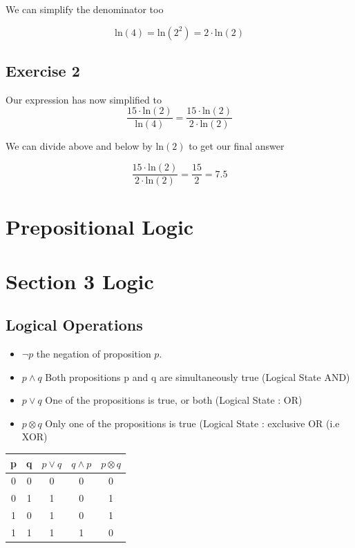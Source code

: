 \documentclass[]{report}
\begin{document}
\begin{enumerate}
We can simplify the denominator too

\[ \mbox{ln}(4) =  \mbox{ln}(2^2) = 2 \cdot \mbox{ln}(2) \]



\subsection{Exercise 2}

Our expression has now simplified to 
\[\frac{15 \cdot \mbox{ln}(2) }{\mbox{ln}(4)} = \frac{15 \cdot \mbox{ln}(2) }{2 \cdot \mbox{ln}(2)} \]

We can divide above and below by $\mbox{ln}(2)$ to get our final answer


\[ \frac{15 \cdot \mbox{ln}(2) }{2 \cdot \mbox{ln}(2)} = \frac{15}{2} = 7.5 \]


\section*{Prepositional Logic}


\newpage
\section{Section 3 Logic}
\subsection{Logical Operations}
\begin{itemize}
\item $\neg p$ the negation of proposition $p$.
\item $p \wedge q$ Both propositions p and q are simultaneously true (Logical State AND)
\item $p \vee q $ One of the propositions is true, or both (Logical State : OR)
\item $p \otimes q$ Only one of the propositions is true (Logical State : exclusive OR (i.e XOR)
\end{itemize}
\begin{center}
\begin{tabular}{|c|c|c|c|c|}
\hline
p & q & $p \vee q$ & $q \wedge p$ & $p \otimes q$ \\
\hline
0 & 0 & 0 & 0 & 0 \\
0 & 1 & 1 & 0 & 1\\
1 & 0 & 1 & 0 & 1 \\
1 & 1 & 1 & 1 & 0\\
\hline
\end{tabular}
\end{center}

\end{enumerate}
\end{document}
